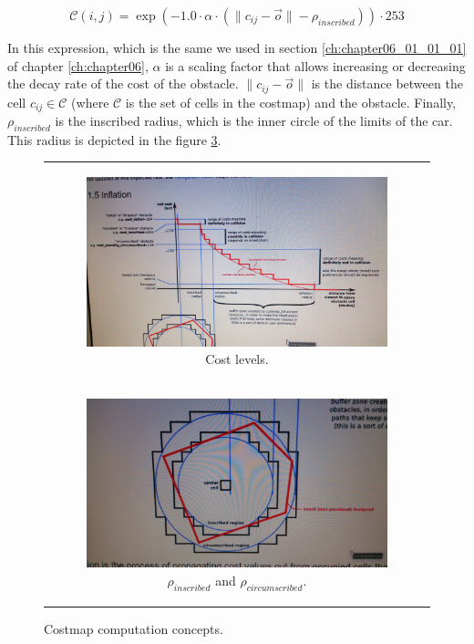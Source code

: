 \begin{equation}\label{eq:cp07_costmap_inflation}
 \mathcal{C}(i, j) = \exp (-1.0 \cdot \alpha \cdot ( \|c_{ij}-\vec{o}\| - \rho_{inscribed})) \cdot 253
\end{equation}

In this expression, which is the same we used in section \ref{ch:chapter06_01_01_01} of chapter \ref{ch:chapter06}, $\alpha$ is a scaling factor that allows increasing or decreasing the decay rate of the cost of the obstacle. $\|c_{ij}-\vec{o}\|$ is the distance between the cell $c_{ij} \in \mathcal{C}$ (where $\mathcal{C}$ is the set of cells in the costmap) and the obstacle. Finally, $\rho_{inscribed}$ is the inscribed radius, which is the inner circle of the limits of the car. This radius is depicted in the figure \ref{fig:cp07_costmap_concepts}.

\begin{figure}[h!]
\centering
\begin{tabular}{c}
  \begin{subfigure}[b]{\textwidth}
    \centering
    \includegraphics[width=\textwidth]{cost_levels}
    \caption{Cost levels.}
    \label{fig:cp07_cost_levels}
  \end{subfigure}\\ 
  \begin{subfigure}[b]{\textwidth}
    \centering
    \includegraphics[width=\textwidth]{inscribed_circumscribed}
    \caption{$\rho_{inscribed}$ and $\rho_{circumscribed}$.}
    \label{fig:cp07_inscribed_circumscribed}
  \end{subfigure}
\end{tabular}
\caption{Costmap computation concepts.}\label{fig:cp07_costmap_concepts}
\end{figure}

